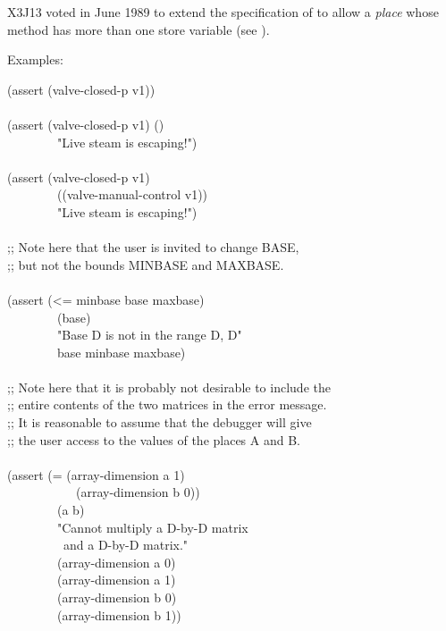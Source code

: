 \begin{defmac}
\begin{newer}
X3J13 voted in June 1989 
to extend the specification of  to allow a {\it place}
whose  method has more than one store variable (see ).
\end{newer}

Examples:
\begin{lisp}
(assert (valve-closed-p v1)) \\
 \\
(assert (valve-closed-p v1) () \\
~~~~~~~~"Live steam is escaping!") \\
 \\
(assert (valve-closed-p v1) \\
~~~~~~~~((valve-manual-control v1)) \\
~~~~~~~~"Live steam is escaping!") \\
 \\
;; Note here that the user is invited to change BASE,  \\
;; but not the bounds MINBASE and MAXBASE. \\[3pt]
\\
(assert (<= minbase base maxbase) \\
~~~~~~~~(base) \\
~~~~~~~~"Base {\Xtilde}D is not in the range {{\Xtilde}D, {\Xtilde}D}" \\
~~~~~~~~base minbase maxbase) \\
 \\
;; Note here that it is probably not desirable to include the \\
;; entire contents of the two matrices in the error message. \\
;; It is reasonable to assume that the debugger will give \\
;; the user access to the values of the places A and B. \\
\\
(assert (= (array-dimension a 1)  \\
~~~~~~~~~~~(array-dimension b 0)) \\
~~~~~~~~(a b) \\
~~~~~~~~"Cannot multiply a {\Xtilde}D-by-{\Xtilde}D matrix {\Xtilde} \\
~~~~~~~~~and a {\Xtilde}D-by-{\Xtilde}D matrix." \\
~~~~~~~~(array-dimension a 0) \\
~~~~~~~~(array-dimension a 1) \\
~~~~~~~~(array-dimension b 0) \\
~~~~~~~~(array-dimension b 1))
\end{lisp}
\end{defmac}

